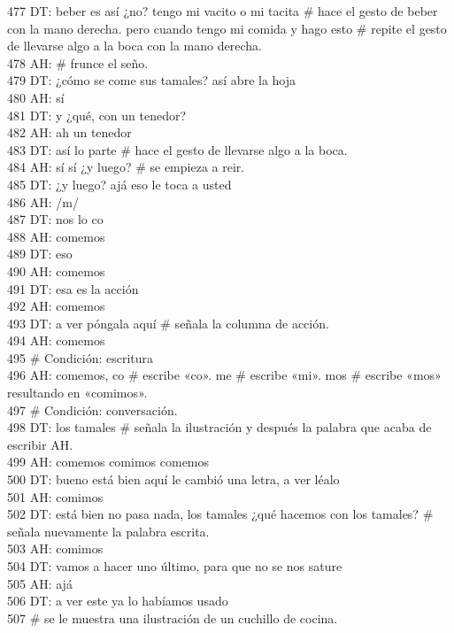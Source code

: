 477 DT: beber es así ¿no? tengo mi vacito o mi tacita \# hace el gesto de beber con la mano derecha. pero cuando tengo mi comida y hago esto \# repite el gesto de llevarse algo a la boca con la mano derecha.\\
478 AH: \# frunce el seño.\\
479 DT: ¿cómo se come sus tamales? así abre la hoja\\
480 AH: sí\\
481 DT: y ¿qué, con un tenedor?\\
482 AH: ah un tenedor\\
483 DT: así lo parte \# hace el gesto de llevarse algo a la boca.\\
484 AH: sí sí ¿y luego? \# se empieza a reir.\\
485 DT: ¿y luego? ajá eso le toca a usted\\
486 AH: /m/\\
487 DT: nos lo co\\
488 AH: comemos\\
489 DT: eso\\
490 AH: comemos\\
491 DT: esa es la acción\\
492 AH: comemos\\
493 DT: a ver póngala aquí \# señala la columna de acción.\\
494 AH: comemos\\
495 \# Condición: escritura\\
496 AH: comemos, co \# escribe «co». me # escribe «mi». mos # escribe «mos» resultando en «comimos».\\
497 \# Condición: conversación.\\
498 DT: los tamales \# señala la ilustración y después la palabra que acaba de escribir AH.\\
499 AH: comemos comimos comemos\\
500 DT: bueno está bien aquí le cambió una letra, a ver léalo\\
501 AH: comimos\\
502 DT: está bien no pasa nada, los tamales ¿qué hacemos con los tamales? \# señala nuevamente la palabra escrita.\\
503 AH: comimos\\
504 DT: vamos a hacer uno último, para que no se nos sature\\
505 AH: ajá\\
506 DT: a ver este ya lo habíamos usado\\
507 \# se le muestra una ilustración de un cuchillo de cocina.\\
